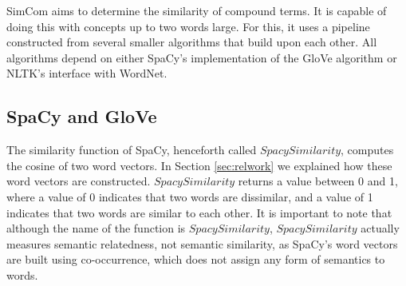 \documentclass{article}
\begin{document}
SimCom aims to determine the similarity of compound terms. It is capable of doing this with concepts up to two words large. For this, it uses a pipeline constructed from several smaller algorithms that build upon each other. All algorithms depend on either SpaCy's implementation of the GloVe algorithm or NLTK's interface with WordNet.

\subsection{SpaCy and GloVe}
The similarity function of SpaCy, henceforth called $\textit{SpacySimilarity}$, computes the cosine of two word vectors. In Section \ref{sec:relwork} we explained how these word vectors are constructed. $\textit{SpacySimilarity}$ returns a value between 0 and 1, where a value of 0 indicates that two words are dissimilar, and a value of 1 indicates that two words are similar to each other. It is important to note that although the name of the function is $\textit{SpacySimilarity}$, $\textit{SpacySimilarity}$ actually measures semantic relatedness, not semantic similarity, as SpaCy's word vectors are built using co-occurrence, which does not assign any form of semantics to words. 
\end{document}
